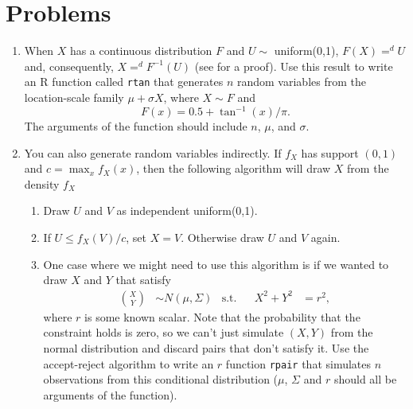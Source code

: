 

\section{Problems}

\begin{enumerate}

\item When $X$ has a continuous distribution $F$ and $U \sim$
  uniform(0,1), $F(X) =^d U$ and, consequently, $X =^d F^{-1}(U)$ (see
  \citealt[Theorem 2.1.10]{CB02} for a proof).  Use this result to
  write an R function called \texttt{rtan} that generates $n$ random
  variables from the location-scale family $\mu + \sigma X$, where $X
  \sim F$ and
  \begin{equation*}
    F(x) = 0.5 + \tan^{-1}(x)/\pi.
  \end{equation*}
  The arguments of the function should include $n$, $\mu$, and $\sigma$.

\item You can also generate random variables indirectly.  If $f_X$ has
  support $(0,1)$ and $c = \max_x f_X(x)$, then the following
  algorithm will draw $X$ from the density $f_X$ \citep[see][Section
  5.6.2]{CB02}
  \begin{enumerate}
  \item Draw $U$ and $V$ as independent uniform(0,1).
  \item If $U \leq f_X(V) / c$, set $X = V$.  Otherwise draw $U$ and $V$
    again.
  \item One case where we might need to use this algorithm is if we
    wanted to draw $X$ and $Y$ that satisfy
    \begin{align*}
      \binom{X}{Y} &\sim N(\mu,\Sigma) & \text{s.t.}&& X^2 + Y^2 &= r^2,
    \end{align*}
    where $r$ is some known scalar.  Note that the probability that
    the constraint holds is zero, so we can't just simulate $(X,Y)$
    from the normal distribution and discard pairs that don't satisfy
    it.  Use the accept-reject algorithm to write an $r$ function
    \texttt{rpair} that simulates $n$ observations from this
    conditional distribution ($\mu$, $\Sigma$ and $r$ should all be arguments
    of the function).
  \end{enumerate}


\end{enumerate}
